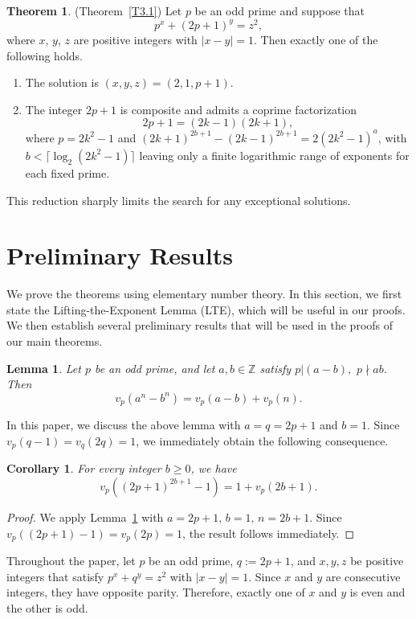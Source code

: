 \documentclass[reqno,12pt]{amsart}
\newtheorem{lemma}[theorem]{Lemma}
\newtheorem{corollary}[theorem]{Corollary}
\theoremstyle{definition}
\newtheorem{thm}{Theorem}
\newcommand{\Z}{\mathbb{Z}}
\begin{document}
\noindent \begin{thm} (Theorem~\ref{T3.1})
\label{A}
Let $p$ be an odd prime and suppose that
\begin{equation*}
p^x + \left ( 2p +1 \right)^y = z^2,
\end{equation*}
where $x$, $y$, $z$ are positive integers with $|x-y|=1$. Then exactly one of the following holds.
\begin{enumerate}
    \item[(i)] The solution is $(x, y, z) = (2, 1, p + 1)$.
    \item[(ii)] The integer $2p + 1$ is composite and admits a coprime factorization 
    \begin{equation*}
        2p + 1 = (2k - 1)(2k + 1),
    \end{equation*}
    where $p=2k^2-1$ and $(2k + 1)^{2b+1} - (2k - 1)^{2b+1} = 2(2k^2 - 1)^a$, with $b  < \lceil \log_2 (2k^2-1) \rceil$ leaving only a finite logarithmic range of exponents for each fixed prime.
\end{enumerate}
\end{thm}
This reduction sharply limits the search for any exceptional solutions.
\section{Preliminary Results}
We prove the theorems using elementary number theory. In this section, we first state the Lifting-the-Exponent Lemma (LTE), which will be useful in our proofs. We then establish several preliminary results that will be used in the proofs of our main theorems.
\begin{lemma}  \label{lemma3}
\normalfont
Let $p$ be an odd prime, and let $a,b \in \Z$ satisfy $p | (a-b), \,\, p \nmid ab$. Then
\begin{equation*}
 v_p(a^n-b^n)=v_p(a-b)+v_p(n).   
\end{equation*}
\end{lemma}
In this paper, we discuss the above lemma with $a=q=2p+1$ and $b=1$. Since $v_p(q-1) = v_q(2q)=1$, we immediately obtain the following consequence.
\begin{corollary} \label{corollary1}
\normalfont For every integer $b \geq 0$, we have 
\begin{equation*}
v_p\!\left((2p+1)^{2b+1}-1\right) = 1+v_p(2b+1).
\end{equation*}
\end{corollary}
\begin{proof}
We apply Lemma~\ref{lemma3} with $a=2p+1, \, b=1,\, n=2b+1$. Since $v_p\!\left((2p+1)-1\right)=v_p(2p)=1$, the result follows immediately.
\end{proof}
Throughout the paper, let $p$ be an odd prime, $q:=2p+1$, and
$x,y,z$ be positive integers that satisfy $\displaystyle p^{x}+q^{y}=z^{2}$ with $|x-y|=1.$ 
Since $x$ and $y$ are consecutive integers, they have opposite parity. Therefore, exactly one of $x$ and $y$ is even and the other is odd. 
\end{document}
